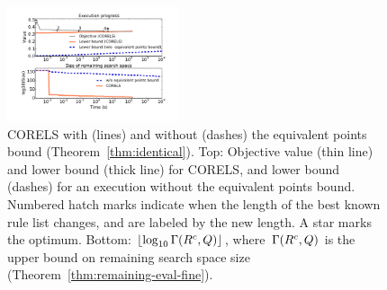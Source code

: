 \begin{figure}[t!]
\begin{center}
\includegraphics[trim={20mm, 25mm, 24mm, 15mm}, width=0.45\textwidth]{figs/compas_execution-remaining-space.pdf}
\end{center}
\caption{CORELS with (lines) and without
(dashes) the equivalent points bound (Theorem~\ref{thm:identical}).
%
%
Top: Objective value (thin line) and lower bound (thick line) for CORELS,
and lower bound (dashes) for an execution without the equivalent points bound.
%
Numbered hatch marks
indicate when the length of the best known rule list changes,
and are labeled by the new length.
%
A star marks the optimum.
%
%
Bottom: $\lfloor \log_{10} \Gamma({R^c}, Q) \rfloor$,
where~$\Gamma({R^c}, Q)$
is the upper bound on remaining search space size
(Theorem~\ref{thm:remaining-eval-fine}).
}
\label{fig:objective}
\end{figure}

